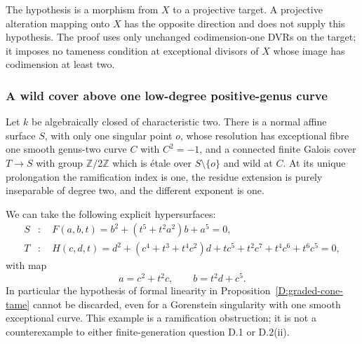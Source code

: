 \begin{remark}
The hypothesis is a morphism from $X$ to a projective target.
A projective alteration mapping onto $X$ has the opposite
direction and does not supply this hypothesis.  The proof
uses only unchanged codimension-one DVRs on the target;
it imposes no tameness condition at exceptional divisors
of $X$ whose image has codimension at least two.
\end{remark}

\subsubsection{A wild cover above one low-degree positive-genus curve}

\begin{example}
\label{D:wild-genus2-single-curve}
Let $k$ be algebraically closed of characteristic two.  There is
a normal affine surface $S$, with only one singular point $o$,
whose resolution has exceptional fibre one smooth genus-two
curve $C$ with $C^2=-1$, and a connected finite Galois cover
$T\to S$ with group $\mathbb Z/2\mathbb Z$ which is \'etale
over $S\setminus\{o\}$ and wild at $C$.  At its unique
prolongation the ramification index is one, the residue
extension is purely inseparable of degree two, and the
different exponent is one.

We can take the following explicit hypersurfaces:
\[
 \begin{aligned}
 S&:\quad F(a,b,t)=b^2+(t^5+t^2a^2)b+a^5=0,\\
 T&:\quad H(c,d,t)=d^2+(c^4+t^3+t^4c^2)d
            +tc^5+t^2c^7+t^4c^6+t^6c^5=0,
 \end{aligned}
\]
with map
\[
                 a=c^2+t^2c,\qquad b=t^2d+c^5.
 \tag{M}
\]
In particular the hypothesis of formal linearity in
Proposition~\ref{D:graded-cone-tame} cannot be discarded,
even for a Gorenstein singularity with one smooth exceptional
curve.  This example is a ramification obstruction; it is not
a counterexample to either finite-generation question D.1 or
D.2(ii).
\end{example}

